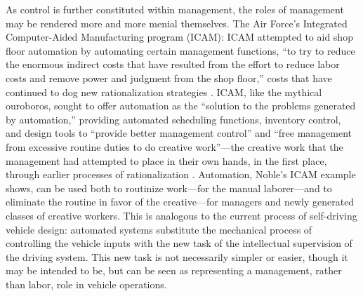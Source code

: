 As control is further constituted within management, the roles of
management may be rendered more and more menial themselves. The Air
Force's Integrated Computer-Aided Manufacturing program (ICAM): ICAM
attempted to aid shop floor automation by automating certain 
management functions, ``to try to reduce the enormous indirect costs
that have resulted from the effort to reduce labor costs and remove
power and judgment from the shop floor,'' costs that have continued to
dog new rationalization strategies \cite[p. 330]{nobleForces}. ICAM, like the mythical
ouroboros, sought to offer automation as the ``solution to the problems
generated by automation,'' providing automated scheduling functions,
inventory control, and design tools to ``provide better management
control'' and ``free management from excessive routine duties to do
creative work''---the creative work that the management had attempted to
place in their own hands, in the first place, through earlier
processes of rationalization \cite[p. 330]{nobleForces}. Automation, Noble's ICAM example shows,
can be used both to routinize work---for the manual laborer---and to
eliminate the routine in favor of the creative---for managers and newly
generated classes of creative workers. This is analogous to the
current process of self-driving vehicle design: automated systems
substitute the mechanical process of controlling the vehicle inputs
with the new task of the intellectual supervision of the driving
system. This new task is not necessarily simpler or easier, though it
may be intended to be, but can be seen as representing a management,
rather than labor, role in vehicle operations.


